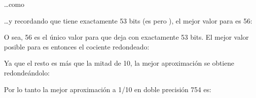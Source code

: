 \documentclass[a4,10pt,spanish]{sphinxmanual}
\begin{document}
\sphinxAtStartPar
…como

\begin{sphinxVerbatim}[commandchars=\\\{\}]
    
\end{sphinxVerbatim}

\sphinxAtStartPar
…y recordando que  tiene exactamente 53 bits (es  pero ), el mejor valor para  es 56:

\begin{sphinxVerbatim}[commandchars=\\\{\}]
        
\end{sphinxVerbatim}

\sphinxAtStartPar
O sea, 56 es el único valor para  que deja  con exactamente 53 bits. El mejor valor posible para  es entonces el cociente redondeado:

\begin{sphinxVerbatim}[commandchars=\\\{\}]
    
\end{sphinxVerbatim}

\sphinxAtStartPar
Ya que el resto es más que la mitad de 10, la mejor aproximación se obtiene redondeándolo:

\begin{sphinxVerbatim}[commandchars=\\\{\}]
\end{sphinxVerbatim}

\sphinxAtStartPar
Por lo tanto la mejor aproximación a 1/10 en doble precisión 754 es:

\begin{sphinxVerbatim}[commandchars=\\\{\}]
    
\end{sphinxVerbatim}
\end{document}
